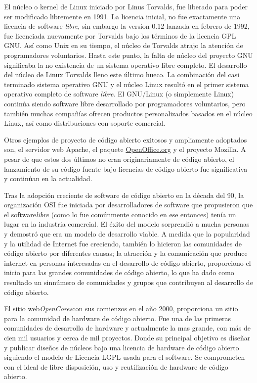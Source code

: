 	El núcleo o kernel de Linux iniciado por Linus Torvalds, fue liberado para poder ser modificado libremente en 1991. La licencia inicial, no fue
	exactamente una licencia de software \textit{libre}, sin embargo la version 0.12 lanzada en febrero de 1992, fue licenciada nuevamente por Torvalds
	bajo los términos de la licencia GPL GNU. Así como Unix en su tiempo, el núcleo de Torvalds atrajo la atención de programadores voluntarios. Hasta
	este punto, la falta de núcleo del proyecto GNU significaba la no existencia de un sistema operativo libre completo. El desarrollo del núcleo de
	Linux Torvalds lleno este último hueco. La combinación del casi terminado sistema operativo GNU y el núcleo Linux resultó en el primer sistema
	operativo completo de software \textit{libre}. El GNU/Linux (o simplemente Linux) continúa siendo software libre desarrollado por programadores
	voluntarios, pero también muchas compañías ofrecen productos personalizados basados en el núcleo Linux, así como distribuciones con soporte
	comercial.

	Otros ejemplos de proyecto de código abierto exitosos y ampliamente adoptados son, el servidor web Apache, el paquete \url{OpenOffice.org} y el
	proyecto Mozilla. A pesar de que estos dos últimos no eran originariamente de código abierto, el lanzamiento de su código fuente bajo licencias de
	código abierto fue significativa y continúan en la actualidad.
	
	Tras la adopción creciente de software de código abierto en la década del 90, la organización OSI fue iniciada por desarrolladores de software que
	propusieron que el software\textit{libre} (como lo fue comúnmente conocido en ese entonces) tenía un lugar en la industria comercial. El éxito
	del modelo sorprendió a mucha personas y demostró que era un modelo de desarrollo viable. A medida que la popularidad y la utilidad de Internet fue
	creciendo, también lo hicieron las comunidades de código abierto por diferentes causas; la atracción y la comunicación que produce internet en
	personas interesadas en el desarrollo de código abierto, proporciono el inicio para las grandes comunidades de código abierto, lo que ha dado como
	resultado un sinnúmero de comunidades y grupos que contribuyen al desarrollo de código abierto.

	El sitio web\textit{OpenCores}con sus comienzos en el año 2000, proporciona un sitio para la comunidad de hardware de código abierto.
 	Fue una de las primeras comunidades de desarrollo de hardware y actualmente la mas grande, con más de cien mil usuarios y cerca de mil proyectos.
 	Donde su principal objetivo es diseñar y publicar diseños de núcleos bajo una licencia de hardware de código abierto siguiendo el modelo de
 	Licencia LGPL usada para el software. Se comprometen con el ideal de libre disposición, uso y reutilización de hardware de código
 	abierto.\cite{Etiqueta10}

